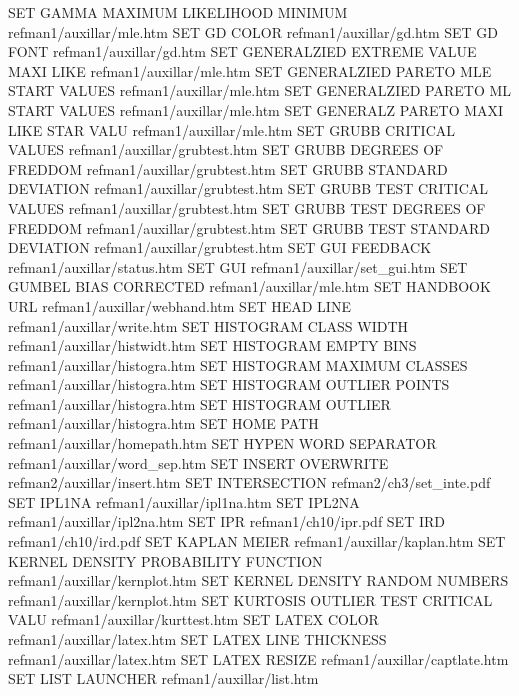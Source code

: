 SET GAMMA MAXIMUM LIKELIHOOD MINIMUM    refman1/auxillar/mle.htm
SET GD COLOR                            refman1/auxillar/gd.htm
SET GD FONT                             refman1/auxillar/gd.htm
SET GENERALZIED EXTREME VALUE MAXI LIKE refman1/auxillar/mle.htm
SET GENERALZIED PARETO MLE START VALUES refman1/auxillar/mle.htm
SET GENERALZIED PARETO ML START VALUES  refman1/auxillar/mle.htm
SET GENERALZ PARETO MAXI LIKE STAR VALU refman1/auxillar/mle.htm
SET GRUBB CRITICAL VALUES               refman1/auxillar/grubtest.htm
SET GRUBB DEGREES OF FREDDOM            refman1/auxillar/grubtest.htm
SET GRUBB STANDARD DEVIATION            refman1/auxillar/grubtest.htm
SET GRUBB TEST CRITICAL VALUES          refman1/auxillar/grubtest.htm
SET GRUBB TEST DEGREES OF FREDDOM       refman1/auxillar/grubtest.htm
SET GRUBB TEST STANDARD DEVIATION       refman1/auxillar/grubtest.htm
SET GUI FEEDBACK                        refman1/auxillar/status.htm
SET GUI                                 refman1/auxillar/set_gui.htm
SET GUMBEL BIAS CORRECTED               refman1/auxillar/mle.htm
SET HANDBOOK URL                        refman1/auxillar/webhand.htm
SET HEAD LINE                           refman1/auxillar/write.htm
SET HISTOGRAM CLASS WIDTH               refman1/auxillar/histwidt.htm
SET HISTOGRAM EMPTY BINS                refman1/auxillar/histogra.htm
SET HISTOGRAM MAXIMUM CLASSES           refman1/auxillar/histogra.htm
SET HISTOGRAM OUTLIER POINTS            refman1/auxillar/histogra.htm
SET HISTOGRAM OUTLIER                   refman1/auxillar/histogra.htm
SET HOME PATH                           refman1/auxillar/homepath.htm
SET HYPEN WORD SEPARATOR                refman1/auxillar/word_sep.htm
SET INSERT OVERWRITE                    refman2/auxillar/insert.htm
SET INTERSECTION                        refman2/ch3/set_inte.pdf
SET IPL1NA                              refman1/auxillar/ipl1na.htm
SET IPL2NA                              refman1/auxillar/ipl2na.htm
SET IPR                                 refman1/ch10/ipr.pdf
SET IRD                                 refman1/ch10/ird.pdf
SET KAPLAN MEIER                        refman1/auxillar/kaplan.htm
SET KERNEL DENSITY PROBABILITY FUNCTION refman1/auxillar/kernplot.htm
SET KERNEL DENSITY RANDOM NUMBERS       refman1/auxillar/kernplot.htm
SET KURTOSIS OUTLIER TEST CRITICAL VALU refman1/auxillar/kurttest.htm
SET LATEX COLOR                         refman1/auxillar/latex.htm
SET LATEX LINE THICKNESS                refman1/auxillar/latex.htm
SET LATEX RESIZE                        refman1/auxillar/captlate.htm
SET LIST LAUNCHER                       refman1/auxillar/list.htm
